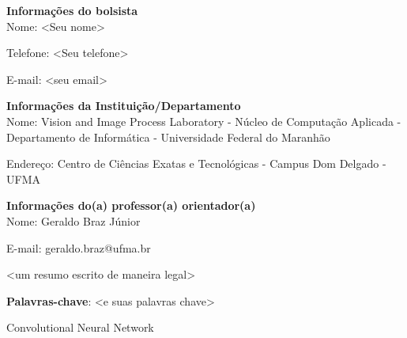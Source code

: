 \documentclass[
	12pt,				%
	openany,
	oneside,
	a4paper,			%
	english,			%
	french,				%
	spanish,			%
	brazil,				%
	]{abntex2}
\begin{document}
\frenchspacing 



\imprimirfolhaderosto

\newpage

\textbf{Informações do bolsista} \\

Nome:  <Seu nome>

Telefone: <Seu telefone>

E-mail: <seu email>


\textbf{Informações da Instituição/Departamento}\\

Nome:  Vision and Image Process Laboratory - Núcleo de Computação Aplicada - Departamento de Informática - Universidade Federal do Maranhão 

Endereço: Centro de Ciências Exatas e Tecnológicas - Campus Dom Delgado - UFMA 


\textbf{Informações do(a) professor(a) orientador(a)} \\

Nome: Geraldo Braz Júnior

E-mail: geraldo.braz@ufma.br

\newpage



\begin{resumo}


<um resumo escrito de maneira legal>


\textbf{Palavras-chave}: <e suas palavras chave>

\end{resumo}
\cleardoublepage
\listoffigures*
\cleardoublepage

\listoftables*
\cleardoublepage

\begin{siglas}
    \item[CNN] Convolutional Neural Network
\end{siglas}
\end{document}
